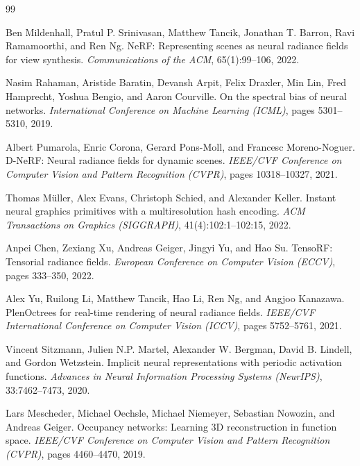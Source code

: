 \documentclass[11pt,a4paper]{article}
\begin{document}

\begin{thebibliography}{99}

Ben Mildenhall, Pratul P. Srinivasan, Matthew Tancik, Jonathan T. Barron, Ravi Ramamoorthi, and Ren Ng.
NeRF: Representing scenes as neural radiance fields for view synthesis.
\textit{Communications of the ACM}, 65(1):99--106, 2022.

Nasim Rahaman, Aristide Baratin, Devansh Arpit, Felix Draxler, Min Lin, Fred Hamprecht, Yoshua Bengio, and Aaron Courville.
On the spectral bias of neural networks.
\textit{International Conference on Machine Learning (ICML)}, pages 5301--5310, 2019.

Albert Pumarola, Enric Corona, Gerard Pons-Moll, and Francesc Moreno-Noguer.
D-NeRF: Neural radiance fields for dynamic scenes.
\textit{IEEE/CVF Conference on Computer Vision and Pattern Recognition (CVPR)}, pages 10318--10327, 2021.

Thomas M\"uller, Alex Evans, Christoph Schied, and Alexander Keller.
Instant neural graphics primitives with a multiresolution hash encoding.
\textit{ACM Transactions on Graphics (SIGGRAPH)}, 41(4):102:1--102:15, 2022.

Anpei Chen, Zexiang Xu, Andreas Geiger, Jingyi Yu, and Hao Su.
TensoRF: Tensorial radiance fields.
\textit{European Conference on Computer Vision (ECCV)}, pages 333--350, 2022.

Alex Yu, Ruilong Li, Matthew Tancik, Hao Li, Ren Ng, and Angjoo Kanazawa.
PlenOctrees for real-time rendering of neural radiance fields.
\textit{IEEE/CVF International Conference on Computer Vision (ICCV)}, pages 5752--5761, 2021.

Vincent Sitzmann, Julien N.P. Martel, Alexander W. Bergman, David B. Lindell, and Gordon Wetzstein.
Implicit neural representations with periodic activation functions.
\textit{Advances in Neural Information Processing Systems (NeurIPS)}, 33:7462--7473, 2020.

Lars Mescheder, Michael Oechsle, Michael Niemeyer, Sebastian Nowozin, and Andreas Geiger.
Occupancy networks: Learning 3D reconstruction in function space.
\textit{IEEE/CVF Conference on Computer Vision and Pattern Recognition (CVPR)}, pages 4460--4470, 2019.


\end{thebibliography}
\end{document}
